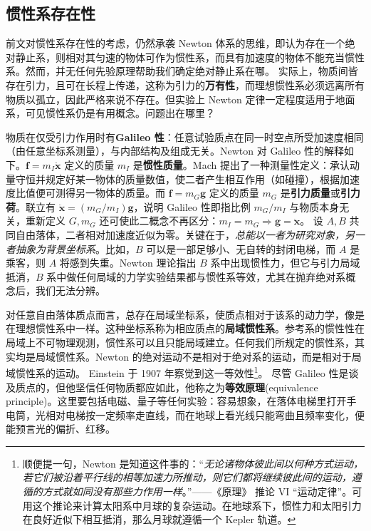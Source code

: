     
\subsection{惯性系存在性}

前文对惯性系存在性的考虑，仍然承袭 Newton 体系的思维，即认为存在一个绝对静止系，则相对其匀速的物体可作为惯性系，而具有加速度的物体不能充当惯性系。然而，并无任何先验原理帮助我们确定绝对静止系在哪。
实际上，物质间皆存在引力，且可在长程上传递，这称为引力的\textbf{万有性}，而理想惯性系必须远离所有物质以孤立，因此严格来说不存在。但实验上 Newton 定律一定程度适用于地面系，可见惯性系仍是有用概念。问题出在哪里？

物质在仅受引力作用时有\textbf{Galileo 性}：任意试验质点在同一时空点所受加速度相同（由任意坐标系测量），与内部结构及组成无关。Newton 对 Galileo 性的解释如下。$\bm f=m_I\ddot{\bm x}$ 定义的质量 $m_I$ 是\textbf{惯性质量}。Mach 提出了一种测量性定义：承认动量守恒并规定好某一物体的质量数值，使二者产生相互作用（如碰撞），根据加速度比值便可测得另一物体的质量。而 $\bm f=m_G\bm g $ 定义的质量 $m_G$ 是\textbf{引力质量}或\textbf{引力荷}。联立有 $\ddot{\bm x}=(m_G/m_I)\bm g $，说明 Galileo 性即指比例 $m_G/m_I$ 与物质本身无关，重新定义 $G,m_G$ 还可使此二概念不再区分：$m_I=m_G\Rightarrow\bm g =\ddot{\bm x}$。
设 $A,B$ 共同自由落体，二者相对加速度近似为零。关键在于，\textit{总能以一者为研究对象，另一者抽象为背景坐标系}。比如，$B$ 可以是一部足够小、无自转的封闭电梯，而 $A$ 是乘客，则 $A$ 将感到失重。Newton 理论指出 $B$ 系中出现惯性力，但它与引力局域抵消，$B$ 系中做任何局域的力学实验结果都与惯性系等效，尤其在抛弃绝对系概念后，我们无法分辨。

对任意自由落体质点而言，总存在局域坐标系，使质点相对于该系的动力学，像是在理想惯性系中一样。这种坐标系称为相应质点的\textbf{局域惯性系}。参考系的惯性性在局域上不可物理观测，惯性系可以且只能局域建立。任何我们所规定的惯性系，其实均是局域惯性系。Newton 的绝对运动不是相对于绝对系的运动，而是相对于局域惯性系的运动。
Einstein 于 1907 年察觉到这一等效性\footnote{顺便提一句，Newton 是知道这件事的：“\textit{无论诸物体彼此间以何种方式运动，若它们被沿着平行线的相等加速力所推动，则它们都将继续彼此间的运动，遵循的方式就如同没有那些力作用一样}。”——《原理》\cite{Principia} 推论 VI “运动定律”。可用这个推论来计算太阳系中月球的复杂运动。在地球系下，惯性力和太阳引力在良好近似下相互抵消，那么月球就遵循一个 Kepler 轨道。}。
尽管 Galileo 性是谈及质点的，但他坚信任何物质都应如此，他称之为\textbf{等效原理}(equivalence principle)。这里要包括电磁、量子等任何实验：容易想象，在落体电梯里打开手电筒，光相对电梯按一定频率走直线，而在地球上看光线只能弯曲且频率变化，便能预言光的偏折、红移。

